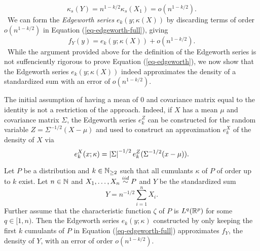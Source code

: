 \begin{equation*}
    \kappa_s(Y) = n^{1-k/2} \kappa_s(X_1) = o(n^{1-k/2}).
\end{equation*}
\
We can form the \textit{Edgeworth series} $e_k(y; \kappa(X))$ by discarding terms of order $o(n^{1-k/2})$ in Equation (\ref{eq-edgeworth-full}), giving
\begin{equation} \label{eq-edgeworth}
    f_Y(y) = e_k(y; \kappa(X)) + o(n^{1-k/2}).
\end{equation}
\
While the argument provided above for the definition of the Edgeworth series is not suffenciently rigorous to prove Equation (\ref{eq-edgeworth}), we now show that the Edgeworth series $e_k(y; \kappa(X))$ indeed approximates the density of a standardized sum with an error of $o(n^{1-k/2})$.

\begin{remark} \label{rem-centering}
    The initial assumption of having a mean of 0 and covariance matrix equal to the identity is not a restriction of the approach. Indeed, if $X$ has a mean $\mu$ and covariance matrix $\Sigma$, the Edgeworth series $e_k^Z$ can be constructed for the random variable $Z = \Sigma^{-1/2}(X - \mu)$ and used to construct an approximation $e^X_k$ of the density of $X$ via
    \begin{equation*}
        e^X_k(x; \kappa) = \left|\Sigma\right|^{-1/2} e_k^Z(\Sigma^{-1/2}(x - \mu)).
    \end{equation*}
\end{remark}

\begin{theorem} \label{thm-edgeworth}
    Let $P$ be a distribution and $k \in \mathbb{N}_{\geq 2}$ such that all cumulants $\kappa$ of $P$ of order up to $k$ exist. Let $n \in \mathbb{N}$ and $X_1, \ldots, X_n \stackrel{iid}{\sim} P$ and $Y$ be the standardized sum
    \begin{equation*}
        Y = n^{-1/2}\sum_{i=1}^n X_i.
    \end{equation*}
    Further assume that the characteristic function $\zeta$ of $P$ is $L^q({\mathbb{R}^p})$ for some $q \in [1, n)$. Then the Edgeworth series $e_k(y; \kappa)$ constructed by only keeping the first $k$ cumulants of $P$ in Equation (\ref{eq-edgeworth-full}) approximates $f_Y$, the density of $Y$, with an error of order $o(n^{1 - k/2})$.
\end{theorem}

